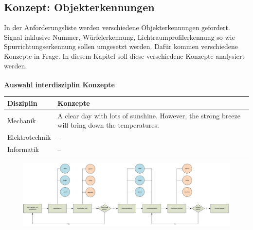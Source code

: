 \documentclass[../../main.tex]{subfiles}
\begin{document}
    \subsection{Konzept: Objekterkennungen}
    In der Anforderungsliste werden verschiedene Objekterkennungen gefordert. Signal inklusive Nummer,
    Würfelerkennung, Lichtraumprofilerkennung so wie Spurrichtungserkennung sollen umgesetzt werden. Dafür 
    kommen verschiedene Konzepte in Frage. In diesem Kapitel soll diese verschiedene Konzepte analysiert 
    werden.\\
    \\

    \textbf{Auswahl interdisziplin Konzepte}\\

    

    \begin{flushleft}
        \begin{tabular}{ | l | p{11cm} |}
        \hline
        \textbf{Disziplin} & \textbf{Konzepte} \\ \hline
        Mechanik & A clear day with lots of sunshine. However, the strong breeze will bring down the
        temperatures. \\ \hline
        Elektrotechnik & -- \\ \hline
        Informatik & -- \\ \hline
        \end{tabular}
    \end{flushleft}


    
    \vspace{2cm}
    \begin{figure}[H] %
        \centering
        \includegraphics[width=1\textwidth]{Ablauf_vision.PNG}
    \end{figure}
\end{document}
